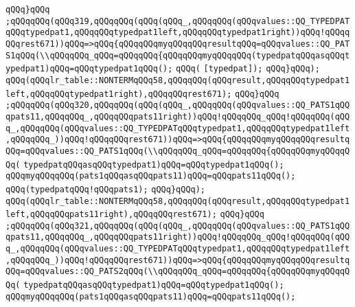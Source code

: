 \verb|qQQq}qQQq|\newline
\verb|;qQQqqQQq(qQQq319,qQQqqQQq(qQQq(qQQq_,qQQqqQQq(qQQqvalues::QQ_TYPEDPATqQQqtypedpat1,qQQqqQQqtypedpat1left,qQQqqQQqtypedpat1right))qQQq!qQQqqQQqrest671))qQQq=>qQQq{qQQqqQQqmyqQQqqQQqresultqQQq=qQQqvalues::QQ_PATS1qQQq(\\qQQqqQQq_qQQq=qQQqqQQq{qQQqqQQqmyqQQqqQQq(typedpatqQQqasqQQqtypedpat1)qQQq=qQQqtypedpat1qQQq();|\newline
\verb|qQQq(|\newline
\verb|[typedpat]);|\newline
\verb|qQQq}qQQq);|\newline
\verb|qQQq(qQQqlr_table::NONTERMqQQq58,qQQqqQQq(qQQqresult,qQQqqQQqtypedpat1left,qQQqqQQqtypedpat1right),qQQqqQQqrest671);|\newline
\verb|qQQq}qQQq|\newline
\verb|;qQQqqQQq(qQQq320,qQQqqQQq(qQQq(qQQq_,qQQqqQQq(qQQqvalues::QQ_PATS1qQQqpats11,qQQqqQQq_,qQQqqQQqpats11right))qQQq!qQQqqQQq_qQQq!qQQqqQQq(qQQq_,qQQqqQQq(qQQqvalues::QQ_TYPEDPATqQQqtypedpat1,qQQqqQQqtypedpat1left,qQQqqQQq_))qQQq!qQQqqQQqrest671))qQQq=>qQQq{qQQqqQQqmyqQQqqQQqresultqQQq=qQQqvalues::QQ_PATS1qQQq(\\qQQqqQQq_qQQq=qQQqqQQq{qQQqqQQqmyqQQqqQQq(|\newline
\verb|typedpatqQQqasqQQqtypedpat1)qQQq=qQQqtypedpat1qQQq();|\newline
\verb|qQQqmyqQQqqQQq(pats1qQQqasqQQqpats11)qQQq=qQQqpats11qQQq();|\newline
\verb|qQQq(typedpatqQQq!qQQqpats1);|\newline
\verb|qQQq}qQQq);|\newline
\verb|qQQq(qQQqlr_table::NONTERMqQQq58,qQQqqQQq(qQQqresult,qQQqqQQqtypedpat1left,qQQqqQQqpats11right),qQQqqQQqrest671);|\newline
\verb|qQQq}qQQq|\newline
\verb|;qQQqqQQq(qQQq321,qQQqqQQq(qQQq(qQQq_,qQQqqQQq(qQQqvalues::QQ_PATS1qQQqpats11,qQQqqQQq_,qQQqqQQqpats11right))qQQq!qQQqqQQq_qQQq!qQQqqQQq(qQQq_,qQQqqQQq(qQQqvalues::QQ_TYPEDPATqQQqtypedpat1,qQQqqQQqtypedpat1left,qQQqqQQq_))qQQq!qQQqqQQqrest671))qQQq=>qQQq{qQQqqQQqmyqQQqqQQqresultqQQq=qQQqvalues::QQ_PATS2qQQq(\\qQQqqQQq_qQQq=qQQqqQQq{qQQqqQQqmyqQQqqQQq(|\newline
\verb|typedpatqQQqasqQQqtypedpat1)qQQq=qQQqtypedpat1qQQq();|\newline
\verb|qQQqmyqQQqqQQq(pats1qQQqasqQQqpats11)qQQq=qQQqpats11qQQq();|\newline
